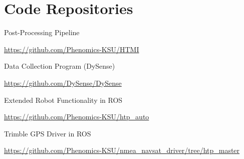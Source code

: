 
\cleardoublepage

\chapter{Code Repositories}
\label{appendix:code_repositories}

\noindent \large Post-Processing Pipeline 

\noindent \url{https://github.com/Phenomics-KSU/HTMI}

\vspace{5mm}

\noindent \large Data Collection Program (DySense)

\noindent \url{https://github.com/DySense/DySense}

\vspace{5mm}

\noindent \large Extended Robot Functionality in ROS 

\noindent \url{https://github.com/Phenomics-KSU/htp_auto}

\vspace{5mm}

\noindent \large Trimble GPS Driver in ROS 

\noindent \url{https://github.com/Phenomics-KSU/nmea_navsat_driver/tree/htp_master}

